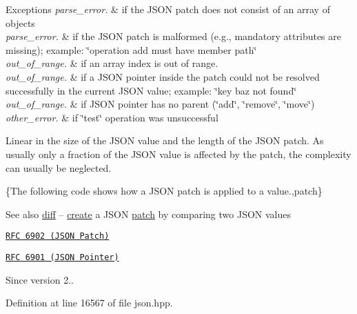 \begin{DoxyExceptions}{Exceptions}
{\em parse\+\_\+error.} & if the J\+S\+ON patch does not consist of an array of objects\\
\hline
{\em parse\+\_\+error.} & if the J\+S\+ON patch is malformed (e.\+g., mandatory attributes are missing); example\+: {\ttfamily \char`\"{}operation add must have member path\char`\"{}}\\
\hline
{\em out\+\_\+of\+\_\+range.} & if an array index is out of range.\\
\hline
{\em out\+\_\+of\+\_\+range.} & if a J\+S\+ON pointer inside the patch could not be resolved successfully in the current J\+S\+ON value; example\+: {\ttfamily \char`\"{}key baz not
found\char`\"{}}\\
\hline
{\em out\+\_\+of\+\_\+range.} & if J\+S\+ON pointer has no parent (\char`\"{}add\char`\"{}, \char`\"{}remove\char`\"{}, \char`\"{}move\char`\"{})\\
\hline
{\em other\+\_\+error.} & if \char`\"{}test\char`\"{} operation was unsuccessful\\
\hline
\end{DoxyExceptions}
Linear in the size of the J\+S\+ON value and the length of the J\+S\+ON patch. As usually only a fraction of the J\+S\+ON value is affected by the patch, the complexity can usually be neglected.

\{The following code shows how a J\+S\+ON patch is applied to a value.,patch\}

\begin{DoxySeeAlso}{See also}
\hyperlink{classnlohmann_1_1basic__json_a543bd5f7490de54c875b2c0912dc9a49}{diff} -- \hyperlink{classnlohmann_1_1basic__json_a81100399cf3e2be457937be7db3f5729}{create} a J\+S\+ON \hyperlink{classnlohmann_1_1basic__json_a81e0c41a4a9dff4df2f6973f7f8b2a83}{patch} by comparing two J\+S\+ON values

\href{https://tools.ietf.org/html/rfc6902}{\tt R\+FC 6902 (J\+S\+ON Patch)} 

\href{https://tools.ietf.org/html/rfc6901}{\tt R\+FC 6901 (J\+S\+ON Pointer)}
\end{DoxySeeAlso}
\begin{DoxySince}{Since}
version 2.. 
\end{DoxySince}


Definition at line 16567 of file json.\+hpp.




